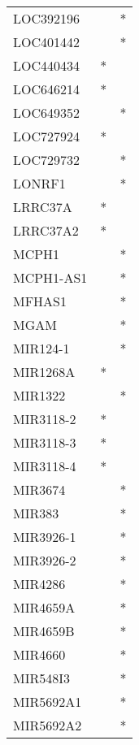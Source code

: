 \begin{longtable}{lcc}
LOC392196    &                &          * \\
LOC401442    &                &          * \\
LOC440434    &              * &            \\
LOC646214    &              * &            \\
LOC649352    &                &          * \\
LOC727924    &              * &            \\
LOC729732    &                &          * \\
LONRF1       &                &          * \\
LRRC37A      &              * &            \\
LRRC37A2     &              * &            \\
MCPH1        &                &          * \\
MCPH1-AS1    &                &          * \\
MFHAS1       &                &          * \\
MGAM         &                &          * \\
MIR124-1     &                &          * \\
MIR1268A     &              * &            \\
MIR1322      &                &          * \\
MIR3118-2    &              * &            \\
MIR3118-3    &              * &            \\
MIR3118-4    &              * &            \\
MIR3674      &                &          * \\
MIR383       &                &          * \\
MIR3926-1    &                &          * \\
MIR3926-2    &                &          * \\
MIR4286      &                &          * \\
MIR4659A     &                &          * \\
MIR4659B     &                &          * \\
MIR4660      &                &          * \\
MIR548I3     &                &          * \\
MIR5692A1    &                &          * \\
MIR5692A2    &                &          * \\

\end{longtable}
